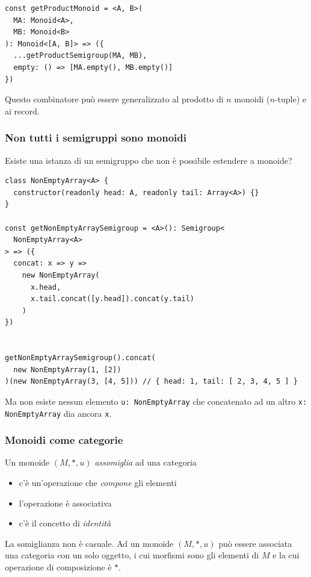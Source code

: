 \documentclass[12pt]{article}
\begin{document}
\begin{verbatim}
const getProductMonoid = <A, B>(
  MA: Monoid<A>,
  MB: Monoid<B>
): Monoid<[A, B]> => ({
  ...getProductSemigroup(MA, MB),
  empty: () => [MA.empty(), MB.empty()]
})
\end{verbatim}

Questo combinatore può essere generalizzato al prodotto di $n$ monoidi ($n$-tuple) e ai record.

\subsubsection{Non tutti i semigruppi sono monoidi}

Esiste una istanza di un semigruppo che non è possibile estendere a monoide?

\begin{verbatim}
class NonEmptyArray<A> {
  constructor(readonly head: A, readonly tail: Array<A>) {}
}

const getNonEmptyArraySemigroup = <A>(): Semigroup<
  NonEmptyArray<A>
> => ({
  concat: x => y =>
    new NonEmptyArray(
      x.head,
      x.tail.concat([y.head]).concat(y.tail)
    )
})


getNonEmptyArraySemigroup().concat(
  new NonEmptyArray(1, [2])
)(new NonEmptyArray(3, [4, 5])) // { head: 1, tail: [ 2, 3, 4, 5 ] }
\end{verbatim}

Ma non esiste nessun elemento \texttt{u: NonEmptyArray} che concatenato ad un altro \texttt{x: NonEmptyArray} dia ancora \texttt{x}.

\subsubsection{Monoidi come categorie}

Un monoide $(M, *, u)$ \emph{assomiglia} ad una categoria

\begin{itemize}
  \item c'è un'operazione che \emph{compone} gli elementi
  \item l'operazione è associativa
  \item c'è il concetto di \emph{identità}
\end{itemize}

La somiglianza non è casuale. Ad un monoide $(M, *, u)$ può essere associata una categoria con un solo oggetto,
i cui morfismi sono gli elementi di $M$ e la cui operazione di composizione è $*$.
\end{document}
